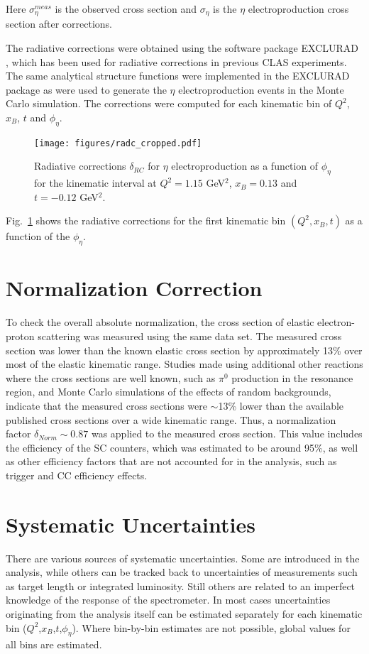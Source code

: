\documentclass[prc,aps,floatfix,showpacs,showkeys,twocolumn,superscriptaddress,letterpaper,10pt]{revtex4-1}
\begin{document}
\noindent
Here $\sigma_\eta^{meas}$ is the observed cross section  and 
$\sigma_{\eta} $ is the $\eta$ electroproduction cross section after corrections.

The radiative corrections were obtained using the software package EXCLURAD \cite{Afanasev:2002ee}, which has been  used for radiative corrections in previous CLAS experiments. 
The same analytical structure functions were implemented in the EXCLURAD package as were used to generate the $\eta$ electroproduction events in the Monte Carlo simulation. The corrections were  computed for each kinematic bin of  $Q^2$, $x_B$,   $t$ and $\phi_\eta$. 
\begin{figure}
\texttt{[image: figures/radc\_cropped.pdf]}
\caption{Radiative corrections  $\delta_{RC}$  for $\eta$  electroproduction as a function of $\phi_\eta$ 
for the kinematic interval at 
$Q^2=1.15$ GeV$^2$, $x_B=0.13$ and $t=-0.12$ GeV$^2$. 
}
\label{fig:rc_2d}
\end{figure}
Fig.~\ref{fig:rc_2d} shows the radiative corrections   
for the first kinematic bin $(Q^2,x_B,t)$ as a function of the $\phi_\eta$. 


\section{Normalization Correction}
\label{normalization}
To check the overall absolute normalization,   the cross section of  elastic electron-proton scattering was measured using the same data set.  The measured cross section was lower than the known elastic cross section \cite{Bosted:1994tm,Christy:2004rc} by approximately 13\% over most of the elastic kinematic range. Studies made using additional other reactions where the cross sections are well known, such as $\pi^0$ production in the resonance region, and Monte Carlo simulations of the effects of random backgrounds, indicate that the measured cross sections were $\sim$13\% lower
than the available published cross sections over a wide kinematic range.
Thus, a normalization factor $\delta_{Norm}\sim 0.87$ was  applied to the measured cross section. This value includes the efficiency of the SC counters, which was estimated to be around  95\%, as well as other efficiency factors that are not accounted for in the analysis, such as trigger and CC efficiency effects. 


\section{Systematic Uncertainties}
\label{systematics}
There are various sources of systematic uncertainties. Some  are introduced in the analysis, while others can be tracked back to uncertainties of measurements such as target length or integrated luminosity.  Still others are related to an imperfect knowledge of the response of the spectrometer. In most cases uncertainties originating from the analysis itself can be estimated separately for each kinematic bin ($Q^2$,$x_B$,$t$,$\phi_\eta$). Where bin-by-bin estimates are not possible, global values for all bins are estimated. 
\end{document}
